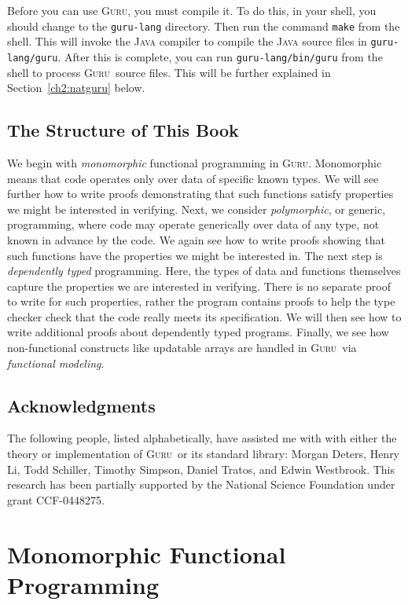 \documentclass{book}[12pt]
\newcommand{\guru}[0]{\textsc{Guru}}
\begin{document}
Before you can use \guru, you must compile it.  To do this, in your
shell, you should change to the \texttt{guru-lang} directory.  Then
run the command \texttt{make} from the shell.  This will invoke the
\textsc{Java} compiler to compile the \textsc{Java} source files in
\texttt{guru-lang/guru}.  After this is complete, you can run
\texttt{guru-lang/bin/guru} from the shell to process \guru\ source
files.  This will be further explained in Section~\ref{ch2:natguru}
below.

\section{The Structure of This Book}

We begin with \emph{monomorphic} functional programming in \guru.
Monomorphic means that code operates only over data of specific known
types. We will see further how to write proofs demonstrating that such
functions satisfy properties we might be interested in verifying.
Next, we consider \emph{polymorphic}, or generic, programming, where
code may operate generically over data of any type, not known in
advance by the code.  We again see how to write proofs showing that
such functions have the properties we might be interested in.  The
next step is \emph{dependently typed} programming.  Here, the types of
data and functions themselves capture the properties we are interested
in verifying.  There is no separate proof to write for such
properties, rather the program contains proofs to help the type
checker check that the code really meets its specification.  We will
then see how to write additional proofs about dependently typed
programs. Finally, we see how non-functional constructs like updatable
arrays are handled in \guru\ via \emph{functional modeling}.

\section{Acknowledgments}

The following people, listed alphabetically, have assisted me with
with either the theory or implementation of \guru\ or its standard
library: Morgan Deters, Henry Li, Todd Schiller, Timothy Simpson,
Daniel Tratos, and Edwin Westbrook.  This research has been partially
supported by the National Science Foundation under grant CCF-0448275.

\chapter{Monomorphic Functional Programming}
\end{document}
